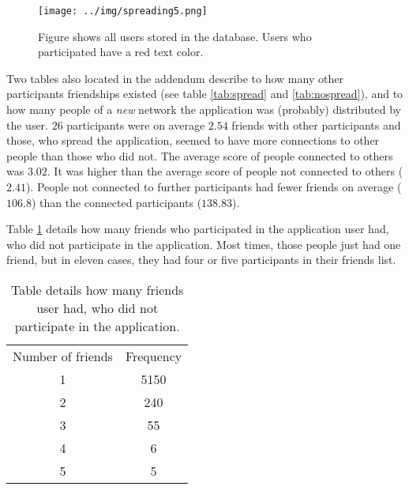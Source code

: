 \documentclass[preprint,12pt]{elsarticle}
\begin{document}
\begin{figure}
  \texttt{[image: ../img/spreading5.png]}
\caption{Figure shows all users stored in the database. Users who
  participated have a red text color.}
\label{fig:spreading}
\end{figure}

Two tables also located in the addendum describe to how many
other participants friendships existed (see table \ref{tab:spread} and
\ref{tab:nospread}), and to how many people of a
\textit{new} network the application was (probably) distributed by the
user. $26$ participants were on average $2.54$ friends with other
participants and those, who spread the application, seemed to have
more connections to other people than those who did not.
The average score of people connected to others was $3.02$. It was
higher than the average score of people not connected to others ($2.41$).
People not connected to further participants had fewer friends on average ($106.8$)
than the connected participants ($138.83$).

Table \ref{tab:nouser} details how many friends who participated in
the application user had, who did not participate in the
application. Most times, those people just had one friend, but in eleven
cases, they had four or five participants in their friends list.

\begin{table}
\label{tab:nouser}
\begin{tabular}{c c}
Number of friends & Frequency \\
1& 5150\\
2& 240\\
3& 55\\
4& 6\\
5& 5\\
\end{tabular}
\caption{Table details how many friends user had, who did not
  participate in the application.}
\end{table}


\end{document}
